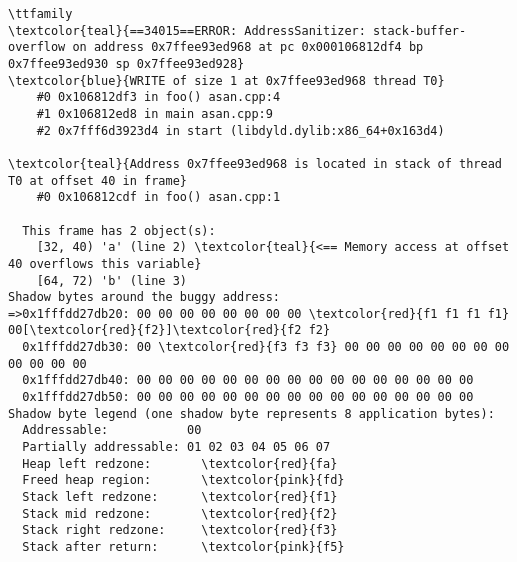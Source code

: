 \begin{frame}[fragile]
  \vspace{-1\baselineskip}
  \begin{columns}
    \column{\textwidth+1cm}
    \scriptsize
    \begin{Verbatim}[commandchars=\\\{\}]
    \ttfamily
\textcolor{teal}{==34015==ERROR: AddressSanitizer: stack-buffer-overflow on address 0x7ffee93ed968 at pc 0x000106812df4 bp 0x7ffee93ed930 sp 0x7ffee93ed928}
\textcolor{blue}{WRITE of size 1 at 0x7ffee93ed968 thread T0}
    #0 0x106812df3 in foo() asan.cpp:4
    #1 0x106812ed8 in main asan.cpp:9
    #2 0x7fff6d3923d4 in start (libdyld.dylib:x86_64+0x163d4)

\textcolor{teal}{Address 0x7ffee93ed968 is located in stack of thread T0 at offset 40 in frame}
    #0 0x106812cdf in foo() asan.cpp:1

  This frame has 2 object(s):
    [32, 40) 'a' (line 2) \textcolor{teal}{<== Memory access at offset 40 overflows this variable}
    [64, 72) 'b' (line 3)
Shadow bytes around the buggy address:
=>0x1fffdd27db20: 00 00 00 00 00 00 00 00 \textcolor{red}{f1 f1 f1 f1} 00[\textcolor{red}{f2}]\textcolor{red}{f2 f2}
  0x1fffdd27db30: 00 \textcolor{red}{f3 f3 f3} 00 00 00 00 00 00 00 00 00 00 00 00
  0x1fffdd27db40: 00 00 00 00 00 00 00 00 00 00 00 00 00 00 00 00
  0x1fffdd27db50: 00 00 00 00 00 00 00 00 00 00 00 00 00 00 00 00
Shadow byte legend (one shadow byte represents 8 application bytes):
  Addressable:           00
  Partially addressable: 01 02 03 04 05 06 07
  Heap left redzone:       \textcolor{red}{fa}
  Freed heap region:       \textcolor{pink}{fd}
  Stack left redzone:      \textcolor{red}{f1}
  Stack mid redzone:       \textcolor{red}{f2}
  Stack right redzone:     \textcolor{red}{f3}
  Stack after return:      \textcolor{pink}{f5}
    \end{Verbatim}
  \end{columns}
\end{frame}

